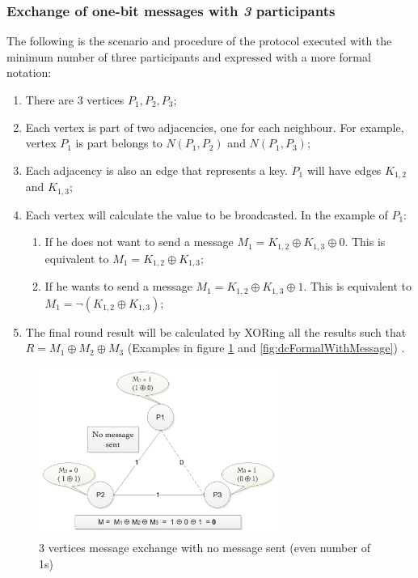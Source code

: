 \subsubsection{Exchange of one-bit messages with \textit{3} participants}
The following is the scenario and procedure of the protocol executed with the minimum number of three participants and expressed with a more formal notation:
\begin{enumerate}
    \item There are 3 vertices \textit{$P_1, P_2, P_3$};
    \item Each vertex is part of two adjacencies, one for each neighbour. For example, vertex \textit{$P_1$} is part belongs to \textit{$N(P_1,P_2)$} and \textit{$N(P_1, P_3)$};
    \item Each adjacency is also an edge that represents a key. \textit{$P_1$} will have edges \textit{$K_{1,2}$} and \textit{$K_{1,3}$};
    \item Each vertex will calculate the value to be broadcasted. In the example of \textit{$P_1$}: 
    \begin{enumerate}
        \item If he does not want to send a message \textit{$M_1 = K_{1,2} \oplus K_{1,3} \oplus 0 $}. This is equivalent to \textit{$M_1 = K_{1,2} \oplus K_{1,3}$};
        \item If he wants to send a message \textit{$M_1 = K_{1,2} \oplus K_{1,3} \oplus 1 $}. This is equivalent to \textit{$M_1 = \neg(K_{1,2} \oplus K_{1,3}) $};
    \end{enumerate}
    \item The final round result will be calculated by XORing all the results such that \textit{$R = M_1 \oplus M_2 \oplus M_3$} (Examples in figure \ref{fig:dcFormalnoMessage} and \ref{fig:dcFormalWithMessage}) .
\end{enumerate}


\begin{figure}[h!]
    \centering
    \includegraphics[width=0.70\textwidth]{Images/DCFormalNoMessage.png}
    \caption{3 vertices message exchange with no message sent (even number of 1s)}
    \label{fig:dcFormalnoMessage}
\end{figure}

